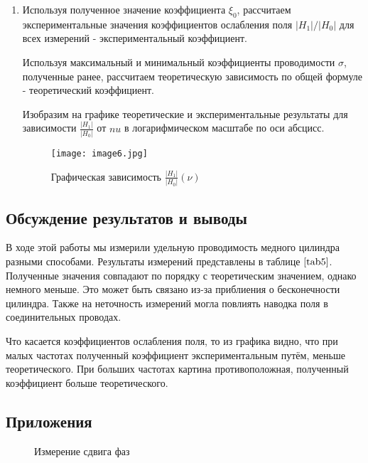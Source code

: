 \documentclass[a4paper,12pt]{article} %
\begin{document}
\begin{enumerate}
    \item Используя полученное значение коэффициента $\xi_0$, рассчитаем экспериментальные значения коэффициентов ослабления поля $|H_1|/|H_0|$ для всех измерений - экспериментальный коэффициент.
    
    Используя максимальный и минимальный коэффициенты проводимости $\sigma$, полученные
    ранее, рассчитаем теоретическую зависимость по общей формуле - теоретический коэффициент.

    Изобразим на графике теоретические и экспериментальные результаты для зависимости $\frac{|H_1|}{|H_0|}$ от $nu$ в логарифмическом масштабе по оси абсцисс.

    \begin{figure}[!h]
        \centering
        \texttt{[image: image6.jpg]}
        \caption{Графическая зависимость $\frac{|H_1|}{|H_0|}(\nu)$}
        \label{graf1}
    \end{figure}
\end{enumerate}

\subsection{Обсуждение результатов и выводы}

В ходе этой работы мы измерили удельную проводимость медного цилиндра разными способами. Результаты измерений представлены в таблице $\ref{tab5}$. Полученные значения совпадают по порядку с теоретическим значением, однако немного меньше. Это может быть связано из-за приблиения о бесконечности цилиндра. Также на неточность измерений могла повлиять наводка поля в соединительных проводах.

Что касается коэффициентов ослабления поля, то из графика видно, что при малых частотах полученный коэффициент экспериментальным путём, меньше теоретического. При больших частотах картина противоположная, полученный коэффициент больше теоретического.

\newpage

\subsection{Приложения}

\begin{figure}[h]
    \begin{minipage}[h]{0.5\linewidth}
    \end{minipage}
    \begin{minipage}[h]{0.5\linewidth}
    \end{minipage}
    \begin{minipage}[h]{0.5\linewidth}
    \end{minipage}
    \begin{minipage}[h]{0.5\linewidth}
    \end{minipage}
    \caption{Измерение сдвига фаз}
\end{figure}
\end{document}
